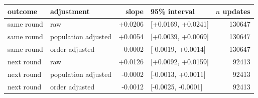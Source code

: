 \begin{tabular}{llrlr}
\toprule
outcome & adjustment & slope & 95\% interval & $n$ updates \\
\midrule
same round & raw & +0.0206 & [+0.0169, +0.0241] & 130647 \\
same round & population adjusted & +0.0054 & [+0.0039, +0.0069] & 130647 \\
same round & order adjusted & -0.0002 & [-0.0019, +0.0014] & 130647 \\
next round & raw & +0.0126 & [+0.0092, +0.0159] & 92413 \\
next round & population adjusted & -0.0002 & [-0.0013, +0.0011] & 92413 \\
next round & order adjusted & -0.0012 & [-0.0025, -0.0001] & 92413 \\
\bottomrule
\end{tabular}